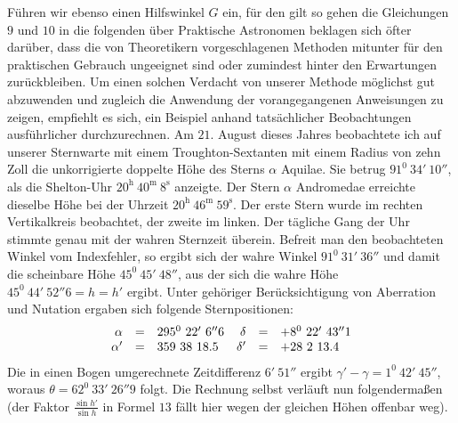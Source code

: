 Führen wir ebenso einen Hilfswinkel $G$ ein, für den gilt
so gehen die Gleichungen $9$ und $10$ in die folgenden über
Praktische Astronomen beklagen sich öfter darüber, dass die von Theoretikern vorgeschlagenen Methoden mitunter für den praktischen Gebrauch ungeeignet sind oder zumindest hinter den Erwartungen zurückbleiben. Um einen solchen Verdacht von unserer Methode möglichst gut abzuwenden und zugleich die Anwendung der vorangegangenen Anweisungen zu zeigen, empfiehlt es sich, ein Beispiel anhand tatsächlicher Beobachtungen ausführlicher durchzurechnen. Am $21$. August dieses Jahres beobachtete ich auf unserer Sternwarte mit einem Troughton-Sextanten mit einem Radius von zehn Zoll die unkorrigierte doppelte Höhe des Sterns $\alpha$ Aquilae. Sie betrug $91^0\ 34'\ 10''$, als die Shelton-Uhr $20^{\mathrm h}\ 40^{\mathrm m}\ 8^{\mathrm s}$ anzeigte. Der Stern $\alpha$ Andromedae erreichte dieselbe Höhe bei der Uhrzeit $20^{\mathrm h}\ 46^{\mathrm m}\ 59^{\mathrm s}$. Der erste Stern wurde im rechten Vertikalkreis beobachtet, der zweite im linken. Der tägliche Gang der Uhr stimmte genau mit der wahren Sternzeit überein. Befreit man den beobachteten Winkel vom Indexfehler, so ergibt sich der wahre Winkel $91^0\ 31'\ 36''$ und damit die scheinbare Höhe $45^0\ 45'\ 48''$, aus der sich die wahre Höhe $45^0\ 44'\ 52''6=h=h'$ ergibt. Unter gehöriger Berücksichtigung von Aberration und Nutation ergaben sich folgende Sternpositionen:
\[
\begin{array}{rcl@{\quad}rcl}
\alpha&=&295^0\ 22'\ 6''6&\delta&=&+8^0\ 22'\ 43''1\\
\alpha'&=&359\ 38\ 18.5&\delta'&=&+28\ 2\ 13.4
\end{array}
\]
Die in einen Bogen umgerechnete Zeitdifferenz $6'\ 51''$ ergibt $\gamma'-\gamma=1^0\ 42'\ 45''$, woraus $\theta=62^0\ 33'\ 26''9$ folgt. Die Rechnung selbst verläuft nun folgendermaßen (der Faktor $\frac{\sin h'}{\sin h}$ in Formel $13$ fällt hier wegen der gleichen Höhen offenbar weg).
